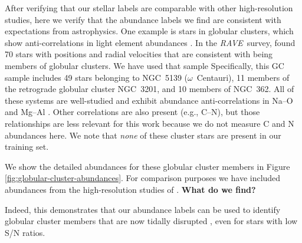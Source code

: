 \documentclass[preprint,trackchanges]{aastex}
\newcommand{\acronym}[1]{{\small{#1}}}
\newcommand{\project}[1]{\textsl{#1}}
\newcommand{\rave}{\project{\acronym{RAVE}}}
\newcommand{\stub}[1]{{\color{blue} \textbf{#1}}}
\begin{document}
After verifying that our stellar labels are comparable with other
high-resolution studies, here we verify that the abundance labels we find
are consistent with expectations from astrophysics.  One example is stars in
globular clusters, which show anti-correlations in light element abundances 
\citep[e.g.,][and references therein]{Da_Costa,Carretta_2009}. In the \rave\
survey, \cite{Anguiano_2015} found 70 stars with positions and radial velocities that are
consistent with being members of globular clusters.  We have used that sample
Specifically, this GC sample includes 49 stars belonging to NGC~5139 ($\omega$~Centauri), 11 members of the retrograde
globular cluster NGC~3201, and 10 members of NGC~362.  
All of these systems are well-studied and exhibit abundance anti-correlations 
in Na--O and Mg--Al \citep{people}.  Other correlations are also present 
(e.g., C--N), but those relationships are less relevant for this work because 
we do not measure C and N abundances here.  We note that \emph{none} of these 
cluster stars are present in our training set.


We show the detailed abundances for these globular cluster members in
Figure \ref{fig:globular-cluster-abundances}.  For comparison purposes we
have included abundances from the high-resolution studies of \citep{people}.
\stub{What do we find?}

Indeed, this demonstrates that our abundance labels can be used to identify
globular cluster members that are now tidally disrupted \citep{Anguiano_2016,Kuzma_2016,Navin_2016},
even for stars with low S/N ratios.




\end{document}

